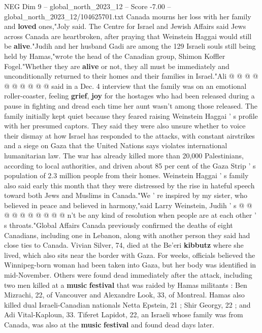 \begin{textsample}{NEG Dim 9 – global\_north\_2023\_12 – Score -7.00 – global\_north\_2023\_12/104625701.txt}
Canada mourns her loss with her family and \textbf{loved} ones,"Joly said.
The Centre for Israel and Jewish Affairs said Jews across Canada are heartbroken, after praying that Weinstein Haggai would still be \textbf{alive}."Judih and her husband Gadi are among the 129 Israeli souls still being held by Hamas,"wrote the head of the Canadian group, Shimon Koffler Fogel."Whether they are \textbf{alive} or not, they all must be immediately and unconditionally returned to their homes and their families in Israel."Ali @ @ @ @ @ @ @ @ @ @ said in a Dec. 4 interview that the family was on an emotional roller-coaster, feeling \textbf{grief}, \textbf{joy} for the hostages who had been released during a pause in fighting and dread each time her aunt wasn't among those released.
The family initially kept quiet because they feared raising Weinstein Haggai ' s profile with her presumed captors.
They said they were also unsure whether to voice their dismay at how Israel has responded to the attacks, with constant airstrikes and a siege on Gaza that the United Nations says violates international humanitarian law.
The war has already killed more than 20,000 Palestinians, according to local authorities, and driven about 85 per cent of the Gaza Strip ' s population of 2.3 million people from their homes.
Weinstein Haggai ' s family also said early this month that they were distressed by the rise in hateful speech toward both Jews and Muslims in Canada."We ' re inspired by my sister, who believed in peace and believed in harmony,"said Larry Weinstein, Judih ' s @ @ @ @ @ @ @ @ @ @ n't be any kind of resolution when people are at each other ' s throats."Global Affairs Canada previously confirmed the deaths of eight Canadians, including one in Lebanon, along with another person they said had close ties to Canada.
Vivian Silver, 74, died at the Be'eri \textbf{kibbutz} where she lived, which also sits near the border with Gaza.
For weeks, officials believed the Winnipeg-born woman had been taken into Gaza, but her body was identified in mid-November.
Others were found dead immediately after the attack, including two men killed at a \textbf{music} \textbf{festival} that was raided by Hamas militants : Ben Mizrachi, 22, of Vancouver and Alexandre Look, 33, of Montreal.
Hamas also killed dual Israeli-Canadian nationals Netta Epstein, 21 ; Shir Georgy, 22 ; and Adi Vital-Kaploun, 33.
Tiferet Lapidot, 22, an Israeli whose family was from Canada, was also at the \textbf{music} \textbf{festival} and found dead days later.

\end{textsample}
